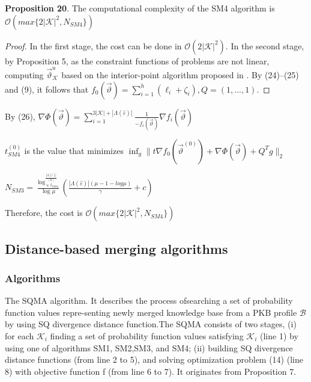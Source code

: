 \documentclass[]{iosart2c}
\begin{document}
  \textbf{Proposition 20}. The computational complexity of the
  SM4 algorithm is $\mathcal{O}(max\{2|\mathcal{K}|^2,N_{SM4}\})$

  \begin{proof}
    In the first stage, the cost can be done in
    $\mathcal{O}(2 |\mathcal{K}|^2)$. In the second stage, by Proposition 5, as
    the constraint functions of problems are not linear,
    computing $\vec{\vartheta}^u_\mathcal{K}$
    based on the interior-point algorithm
    proposed in \cite{29}. By (24)–(25) and (9), it follows that
    $f_0\left(\vec{\vartheta}\right) = \sum^h_{i=1}(\ell_i + \zeta_i),Q = (1, ... , 1)$.
  \end{proof}

  By (26), $\nabla \Phi \left( \vec{\vartheta} \right) = \sum^{3|\mathcal{K}|+|\Lambda(\hat{\varepsilon})|}_{i=1} \frac{1}{-f_i\left(\vec{\vartheta}\right)} \nabla f_i \left( \vec{\vartheta} \right)$

  $t^{(0)}_{SM4}$ is the value that minimizes
  $\inf_g \parallel t\nabla f_0 \left( \vec{\vartheta}^(0) \right) + \nabla \Phi \left( \vec{\vartheta} \right) + Q^T g \parallel_2$

  $N_{SM3} = \frac{\log^{\frac{|\Lambda(\hat{\varepsilon})|}{(0)}}_{\in t_{SM4}}}{\log\mu} \left( \frac{ |\Lambda(\hat{\varepsilon})| (\mu - 1 - log\mu)}{\gamma} + c\right)$

  Therefore, the cost is $\mathcal{O}(max\{2 |\mathcal{K}|^2 ,N_{SM4}\})$

  \subsection{Distance-based merging algorithms}

  \subsubsection{Algorithms}

  The SQMA algorithm. It describes the process ofsearching a set of probability function values repre-senting newly merged knowledge base from a PKB
  profile $\mathcal{B}$ by using SQ divergence distance function.The SQMA consists of two stages, (i) for each $\mathcal{K}_i$
  finding a set of probability function values satisfying $\mathcal{K}_i$ (line 1) by using one of algorithms SM1, SM2,SM3, and SM4; (ii) building SQ divergence distance
  functions (from line 2 to 5), and solving optimization problem (14) (line 8) with objective function f (from line 6 to 7). It originates from Proposition 7.
\end{document}

